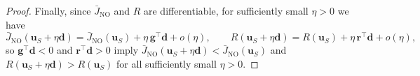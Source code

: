 \documentclass[10pt,a4paper]{amsart}
\begin{document}
\begin{proof}
\medskip\noindent
Finally, since $\bar{J}_{\mathrm{NO}}$ and $R$ are differentiable, for sufficiently small $\eta>0$ we have
\[
\bar{J}_{\mathrm{NO}}(\mathbf{u}_S+\eta \mathbf{d})=\bar{J}_{\mathrm{NO}}(\mathbf{u}_S)+\eta\, \mathbf{g}^\top \mathbf{d}+o(\eta),
\qquad
R(\mathbf{u}_S+\eta \mathbf{d})=R(\mathbf{u}_S)+\eta\, \mathbf{r}^\top \mathbf{d}+o(\eta),
\]
so $\mathbf{g}^\top \mathbf{d}<0$ and $\mathbf{r}^\top \mathbf{d}>0$ imply
$\bar{J}_{\mathrm{NO}}(\mathbf{u}_S+\eta \mathbf{d})<\bar{J}_{\mathrm{NO}}(\mathbf{u}_S)$ and
$R(\mathbf{u}_S+\eta \mathbf{d})>R(\mathbf{u}_S)$ for all sufficiently small $\eta>0$.
\end{proof}
\end{document}
